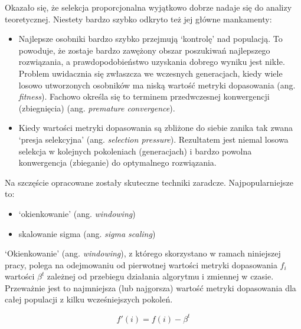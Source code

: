 \documentclass[a4paper,11pt]{article}
\begin{document}
    Okazało się, że selekcja proporcjonalna wyjątkowo dobrze nadaje się do analizy teoretycznej. Niestety bardzo szybko odkryto też jej główne mankamenty\cite{IntroductionToEvolutionaryComputing2015}:
    \begin{itemize}
        \item Najlepsze osobniki bardzo szybko przejmują `kontrolę' nad populacją. To powoduje, że zostaje bardzo zawężony obszar poszukiwań najlepszego rozwiązania, a prawdopodobieństwo uzyskania dobrego wyniku jest nikłe. Problem uwidacznia się zwłaszcza we wczesnych generacjach, kiedy wiele losowo utworzonych osobników ma niską wartość metryki dopasowania (ang. \textit{fitness}). Fachowo określa się to terminem przedwczesnej konwergencji (zbiegnięcia) (ang. \textit{premature convergence}).
        \item Kiedy wartości metryki dopasowania są zbliżone do siebie zanika tak zwana `presja selekcyjna' (ang. \textit{selection pressure}). Rezultatem jest niemal losowa selekcja w kolejnych pokoleniach (generacjach) i bardzo powolna konwergencja (zbieganie) do optymalnego rozwiązania.
    \end{itemize}

    \bigskip

    \noindent
    \begin{minipage}[H]{\textwidth}
        \setlength\parindent{17pt} Na szczęście opracowane zostały skuteczne techniki zaradcze. Najpopularniejsze to:
        \begin{itemize}
            \item `okienkowanie' (ang. \textit{windowing})
            \item skalowanie sigma (ang. \textit{sigma scaling})
        \end{itemize}
    \end{minipage}

    \bigskip

    `Okienkowanie' (ang. \textit{windowing}), z którego skorzystano w ramach niniejszej pracy, polega na odejmowaniu od pierwotnej wartości metryki dopasowania  $f_{i}$ wartości $\beta^{t}$ zależnej od przebiegu działania algorytmu i zmiennej w czasie. Przeważnie jest to najmniejsza (lub najgorsza) wartość metryki dopasowania dla całej populacji z kilku wcześniejszych pokoleń\cite{IntroductionToEvolutionaryComputing2015}.

    \bigskip

    \begin{equation}
        \label{eq:new_fitness}
        f'(i) = f(i) - \beta^{t}
    \end{equation}
\end{document}
